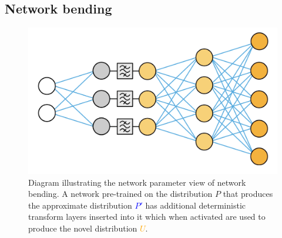 \subsection{Network bending}
\label{survey:bending}

\begin{figure}[!htbp]
    \centering
    \includegraphics[width=1\textwidth]{figures/c6_active_div/diagrams/network_bending.png}
    \caption[Diagram illustrating the network parameter view of network bending.]{Diagram illustrating the network parameter view of network bending. A network pre-trained on the distribution $P$ that produces the approximate distribution \textcolor{blue}{$P'$} has additional deterministic transform layers inserted into it which when activated are used to produce the novel distribution \textcolor{orange}{$U$}.}
  \label{fig:c6:network-bending}
  \end{figure}

